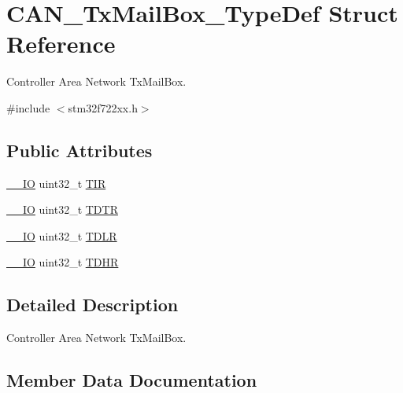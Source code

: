 \hypertarget{struct_c_a_n___tx_mail_box___type_def}{}\section{C\+A\+N\+\_\+\+Tx\+Mail\+Box\+\_\+\+Type\+Def Struct Reference}
\label{struct_c_a_n___tx_mail_box___type_def}


Controller Area Network Tx\+Mail\+Box.  




{\ttfamily \#include $<$stm32f722xx.\+h$>$}

\subsection*{Public Attributes}
\begin{DoxyCompactItemize}
\item 
\mbox{\hyperlink{core__sc300_8h_aec43007d9998a0a0e01faede4133d6be}{\+\_\+\+\_\+\+IO}} uint32\+\_\+t \mbox{\hyperlink{struct_c_a_n___tx_mail_box___type_def_a22f525c909de2dcec1d4093fe1d562b8}{T\+IR}}
\item 
\mbox{\hyperlink{core__sc300_8h_aec43007d9998a0a0e01faede4133d6be}{\+\_\+\+\_\+\+IO}} uint32\+\_\+t \mbox{\hyperlink{struct_c_a_n___tx_mail_box___type_def_a2351cb865d064cf75f61642aaa887f76}{T\+D\+TR}}
\item 
\mbox{\hyperlink{core__sc300_8h_aec43007d9998a0a0e01faede4133d6be}{\+\_\+\+\_\+\+IO}} uint32\+\_\+t \mbox{\hyperlink{struct_c_a_n___tx_mail_box___type_def_a408c96501b1cc8bd527432736d132a39}{T\+D\+LR}}
\item 
\mbox{\hyperlink{core__sc300_8h_aec43007d9998a0a0e01faede4133d6be}{\+\_\+\+\_\+\+IO}} uint32\+\_\+t \mbox{\hyperlink{struct_c_a_n___tx_mail_box___type_def_a98c6bcd7c9bae378ebf83fd9f5b59020}{T\+D\+HR}}
\end{DoxyCompactItemize}


\subsection{Detailed Description}
Controller Area Network Tx\+Mail\+Box. 

\subsection{Member Data Documentation}
\mbox{\label{struct_c_a_n___tx_mail_box___type_def_a98c6bcd7c9bae378ebf83fd9f5b59020}} 
